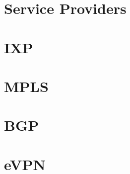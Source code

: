 \documentclass[a4paper,12pt,twoside,twocolumn,landscape]{book}
\begin{document}
\section{Service Providers}

\section{IXP}

\section{MPLS}

\section{BGP}

\section{eVPN}


\clearpage

\printglossary[type=\acronymtype,title=Special Terms,toctitle=List of terms]


\renewcommand{\listfigurename}{List of {\footnotesize hidden} Figures}
\listoffigures


\renewcommand{\listtablename}{Tables {\footnotesize hidding} on the pages}
\listoftables




\end{document}
